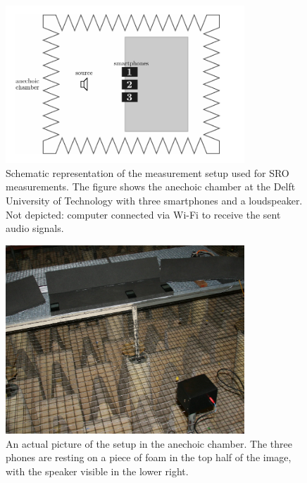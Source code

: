 \documentclass[a4paper, notitlepage]{report}
\begin{document}
\begin{figure}[hbt]
	\centering
		\includegraphics[width=0.8\textwidth]{figures/sro-measurement/measurement_setup}
		\caption[Measurement setup used for SRO measurements.]{Schematic representation of the measurement setup used for SRO measurements. The figure shows the anechoic chamber at the Delft University of Technology with three smartphones and a loudspeaker. Not depicted: computer connected via Wi-Fi to receive the sent audio signals.}
		\label{fig:sro_measurement_setup}
\end{figure}

\begin{figure}[bht]
	\centering
		\includegraphics[width=0.8\textwidth]{figures/sro-measurement/measurement_picture}
		\caption[SRO measurement setup in the anechoic chamber.]{An actual picture of the setup in the anechoic chamber. The three phones are resting on a piece of foam in the top half of the image, with the speaker visible in the lower right.}
		\label{fig:sro_measurement_picture}
\end{figure}
\end{document}

